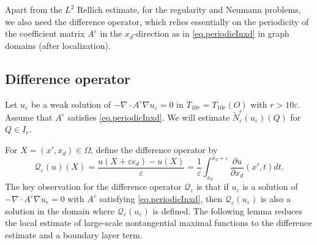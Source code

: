 \documentclass[reqno,12pt]{amsart} %
\theoremstyle{definition}
\theoremstyle{remark}
\numberwithin{equation}{section}
\newcommand{\Q}{\mathcal{Q}}
\newcommand{\e}{\varepsilon}
\begin{document}
Apart from the $L^2$ Rellich estimate, for the regularity and Neumann problems, we also need the difference operator, which relies essentially on the periodicity of the coefficient matrix $A^\e$ in the $x_d$-direction as in \eqref{eq.periodicInxd} in graph domains (after localization). 

\subsection{Difference operator}

Let $u_\e$ be a weak solution of $-\nabla\cdot A^\e \nabla u_\e = 0$ in $T_{10r} = T_{10r}(O)$ with $r>10\e$. Assume that $A^\e$ satisfies \eqref{eq.periodicInxd}. We will estimate $\widetilde{N}_\e^r(u_\e)(Q)$ for $Q \in I_{r}$.

For $X = (x',x_d) \in \Omega$, define the difference operator by
\begin{equation}\label{def.Qe}
    \Q_\e(u)(X) = \frac{ u(X + \e e_d) - u(X)}{\e} = \frac{1}{\e} \int_{x_d}^{x_d + \e} \frac{\partial u}{\partial x_d}(x',t) dt.
\end{equation}
The key observation for the difference operator $\Q_\e$ is that if $u_\e$ is a solution of $-\nabla\cdot A^\e \nabla u_\e = 0$ with $A^\e$ satisfying \eqref{eq.periodicInxd}, then $\Q_\e(u_\e)$ is also a solution in the domain where $\Q_\e(u_\e)$ is defined. The following lemma reduces the local estimate of large-scale nontangential maximal functions to the difference estimate and a boundary layer term.
\end{document}
